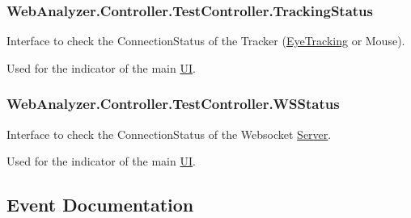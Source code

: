 \subsubsection[{Tracking\+Status}]{ Web\+Analyzer.\+Controller.\+Test\+Controller.\+Tracking\+Status\hspace{0.3cm}{\ttfamily [get]}}\label{class_web_analyzer_1_1_controller_1_1_test_controller_adc0db19e3cc5958f24dd5fd09ce34d98}


Interface to check the Connection\+Status of the Tracker (\hyperlink{namespace_web_analyzer_1_1_eye_tracking}{Eye\+Tracking} or Mouse). 

Used for the indicator of the main \hyperlink{namespace_web_analyzer_1_1_u_i}{U\+I}. \hypertarget{class_web_analyzer_1_1_controller_1_1_test_controller_a1f3032c3be238b03976be19319a64eeb}{}
\subsubsection[{W\+S\+Status}]{ Web\+Analyzer.\+Controller.\+Test\+Controller.\+W\+S\+Status\hspace{0.3cm}{\ttfamily [get]}}\label{class_web_analyzer_1_1_controller_1_1_test_controller_a1f3032c3be238b03976be19319a64eeb}


Interface to check the Connection\+Status of the Websocket \hyperlink{namespace_web_analyzer_1_1_server}{Server}. 

Used for the indicator of the main \hyperlink{namespace_web_analyzer_1_1_u_i}{U\+I}. 

\subsection{Event Documentation}
\hypertarget{class_web_analyzer_1_1_controller_1_1_test_controller_a45f8340dcea78391a3f58e5c7996d126}{}

